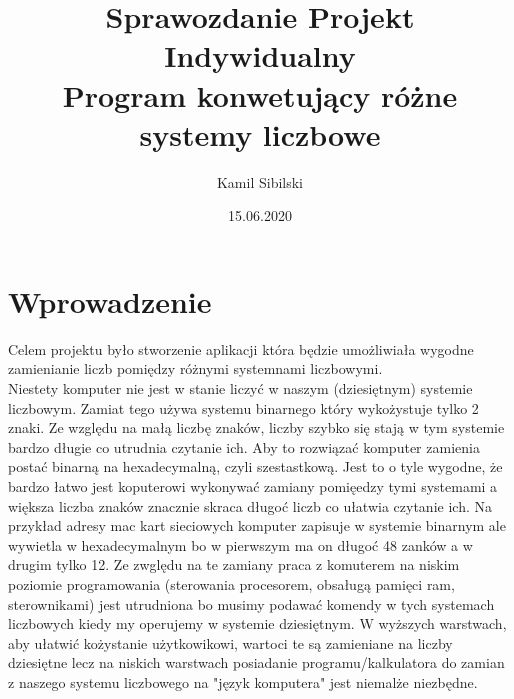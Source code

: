 \documentclass[11pt,a4paper]{article}
\title{%
 Sprawozdanie Projekt Indywidualny \\
  \large Program konwetujący różne systemy liczbowe}
\author{Kamil Sibilski}
\date{15.06.2020}
\begin{document}
\maketitle

\tableofcontents
\newpage

\section{Wprowadzenie}
Celem projektu było stworzenie aplikacji która będzie umożliwiała wygodne zamienianie liczb pomiędzy różnymi systemnami liczbowymi.\\
Niestety komputer nie jest w stanie liczyć w naszym (dziesiętnym) systemie liczbowym. Zamiat tego używa systemu binarnego który wykożystuje tylko 2 znaki. Ze względu na małą liczbę znaków, liczby szybko się stają w tym systemie bardzo długie co utrudnia czytanie ich. Aby to rozwiązać komputer zamienia postać binarną na hexadecymalną, czyli szestastkową. Jest to o tyle wygodne, że bardzo łatwo jest koputerowi wykonywać zamiany pomięedzy tymi systemami a większa liczba znaków znacznie skraca długoć liczb co ułatwia czytanie ich. Na przykład adresy mac kart sieciowych komputer zapisuje w systemie binarnym ale wywietla w hexadecymalnym bo w pierwszym ma on długoć 48 zanków a w drugim tylko 12. Ze zwględu na te zamiany praca z komuterem na niskim poziomie programowania (sterowania procesorem, obsaługą pamięci ram, sterownikami) jest utrudniona bo musimy podawać komendy w tych systemach liczbowych kiedy my operujemy w systemie dziesiętnym. W wyższych warstwach, aby ułatwić kożystanie użytkowikowi, wartoci te są zamieniane na liczby dziesiętne lecz na niskich warstwach posiadanie programu/kalkulatora do zamian z naszego systemu liczbowego na "język komputera" jest niemalże niezbędne.\\
\end{document}
